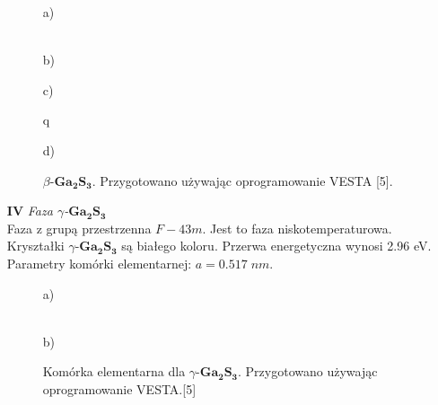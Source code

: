 \begin{enumerate}
	\begin{figure}[H]
		\begin{minipage}[h]{0.47\linewidth}
			 a) \\
		\end{minipage}
		\hfill
		\begin{minipage}[h]{0.47\linewidth}
			 \\b)
		\end{minipage}
		\vfill
		\begin{minipage}[h]{0.47\linewidth}
			 c) \\
		\end{minipage}q
		\hfill
		\begin{minipage}[h]{0.47\linewidth}
			 d) \\
		\end{minipage}
		\caption{$\beta$-$\mathbf{Ga_{2}S_{3}}$. Przygotowano używając oprogramowanie VESTA [5].}
	\end{figure}

	\item[\textbf{IV}] \textit{Faza $\gamma$-$\mathbf{Ga_{2}S_{3}}$} \\
	Faza z grupą przestrzenna $F-43m$. Jest to faza niskotemperaturowa. Kryształki $\gamma$-$\mathbf{Ga_{2}S_{3}}$ są białego koloru. Przerwa energetyczna wynosi 2.96 eV. Parametry komórki elementarnej: $a=0.517\;nm$.
	\begin{center}
		\begin{figure}[H]
			\begin{minipage}[h]{0.47\linewidth}
				 a) \\
			\end{minipage}
			\hfill
			\begin{minipage}[h]{0.47\linewidth}
				 \\b)
			\end{minipage}
			\caption{Komórka elementarna dla $\gamma$-$\mathbf{Ga_{2}S_{3}}$. Przygotowano używając oprogramowanie VESTA.[5]}
		\end{figure}
	\end{center}
	
\end{enumerate}

